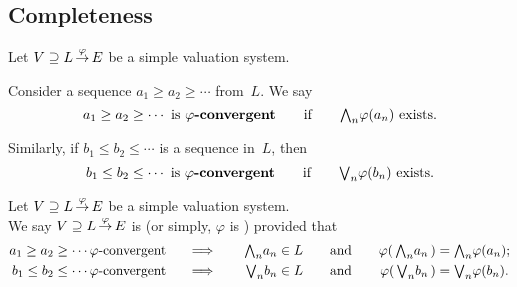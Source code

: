 \documentclass[main.tex]{subfiles}
\begin{document}
\subsection{Completeness}
%
%
\begin{dfn}
Let $V \supseteq L\,\smash{\stackrel{\varphi}{\rightarrow}}\,E$ be a simple valuation system.

Consider a sequence
$a_1 \geq a_2 \geq \dotsb$ from~$L$.
We say
\begin{equation*}
a_1 \geq a_2 \geq \dotsb \text{ is \textbf{$\varphi$-convergent}}
\qquad\text{if}\qquad \textstyle{\bigwedge}_n \varphi(a_n)\text{ exists.}
\end{equation*}

Similarly,
if
$b_1 \leq b_2 \leq \dotsb$ is
a sequence in~$L$, then 
\begin{equation*}
b_1 \leq b_2 \leq \dotsb \text{ is \textbf{$\varphi$-convergent}}
\qquad\text{if}\qquad \textstyle{\bigvee}_n \varphi(b_n)\text{ exists.}
\end{equation*}
\end{dfn}
%
%
\begin{dfn}
\label{D:system-complete}
Let $V \supseteq L\,\smash{\stackrel{\varphi}{\rightarrow}}\,E$ be a simple valuation system.\\
We say $V \supseteq L\,\smash{\stackrel{\varphi}{\rightarrow}}\,E$
is 
(or simply, $\varphi$ is )
 provided that
\begin{alignat*}{5}
a_1 \geq a_2 \geq \dotsb \text{$\varphi$-convergent }
  \quad &\implies \quad 
  & \textstyle{\bigwedge}_n a_n &\in L\quad 
  &&\text{and}\quad
  &\varphi(\,\textstyle{\bigwedge}_n a_n\,) &= \textstyle{\bigwedge}_n \varphi(a_n); \\
b_1 \leq b_2 \leq \dotsb \text{$\varphi$-convergent }
  \quad &\implies \quad 
  & \textstyle{\bigvee}_n b_n &\in L\quad 
  &&\text{and}\quad
  &\varphi(\,\textstyle{\bigvee}_n b_n\,) &= \textstyle{\bigvee}_n \varphi(b_n).
\end{alignat*}
\end{dfn}

\end{document}
